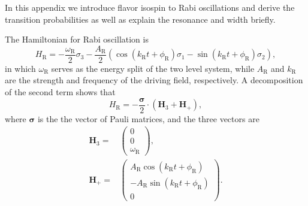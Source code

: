 \documentclass[%
reprint,
 amsmath,amssymb,
 aps,
]{revtex4-1}
\begin{document}
In this appendix we introduce flavor isospin \cite{Duan2006a} to Rabi oscillations and derive the transition probabilities as well as explain the resonance and width briefly.


The Hamiltonian for Rabi oscillation is
\begin{equation}
    H_{\mathrm R} = -\frac{\omega_{\mathrm R}}{2}\sigma_3 - \frac{A_{\mathrm{R}} }{2}  \left( \cos(k_{\mathrm{R}} t +\phi_{\mathrm{R}})\sigma_1  - \sin(k_{\mathrm{R}} t +\phi_{\mathrm{R}}) \sigma_2\right),
    \label{rabi-oscillation-single-perturbation}
\end{equation}
in which $\omega_{\mathrm R}$ serves as the energy split of the two level system, while $A_{\mathrm{R}}$ and $k_{\mathrm{R}}$ are the strength and frequency of the driving field, respectively. A decomposition of the second term shows that
\begin{equation*}
H_{\mathrm R} 
= - \frac{\boldsymbol{\sigma}}{2} \cdot (\mathbf{H}_3 + \mathbf{H}_+ ) ,
\end{equation*}
where $\boldsymbol{\sigma}$ is the the vector of Pauli matrices, and the three vectors are
\begin{align}
    \mathbf{H}_3 = & \begin{pmatrix}
    0 \\ 0 \\ \omega_{\mathrm R}
    \end{pmatrix}, \\
    \mathbf{H}_+ = & \begin{pmatrix}
    A_{\mathrm{R}} \cos(k_{\mathrm{R}} t +\phi_{\mathrm{R}}) \\
    - A_{\mathrm{R}} \sin(k_{\mathrm{R}} t +\phi_{\mathrm{R}}) \\
    0
    \end{pmatrix}.
\end{align}
\end{document}
